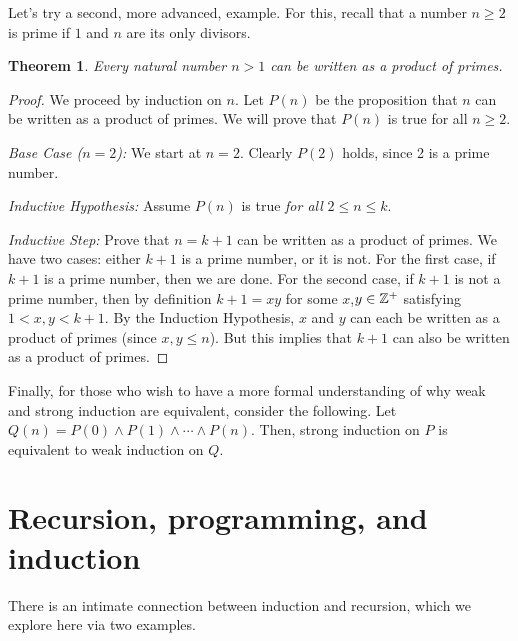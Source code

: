 \documentclass[11pt]{article}
\newcounter{thm}
\newtheorem{theorem}{Theorem}[thm]
\begin{document}
Let's try a second, more advanced, example. For this, recall that a number $n\geq 2$ is prime if $1$ and $n$ are its only divisors.

\begin{theorem}\label{thm:prodprimes}
    Every natural number $n > 1$ can be written as a product of primes.
\end{theorem}
\begin{proof}
We proceed by induction on $n$. Let $P(n)$ be the proposition
that $n$ can be written as a product of primes. We will prove that $P(n)$ is true for all $n \geq 2$.

\emph{Base Case ($n=2$):} We start at $n = 2$. Clearly $P(2)$ holds, since 2 is a prime number.

\emph{Inductive Hypothesis:} Assume $P(n)$ is true \emph{for all} $2 \leq n \leq k$.

\emph{Inductive Step:} Prove that $n=k+1$ can be written as a product of primes.
We have two cases: either $k+1$ is a prime number, or it is not.  For the first case, if $k+1$ is a prime
number, then we are done. For the second case, if $k+1$ is not a prime number, then by definition $k+1 = xy$ for some $x$,$y \in \mathbb{Z}^+$ satisfying $1 < x,y < k+1$. By the Induction Hypothesis, $x$ and $y$ can each be written as a product of primes
(since $x,y \leq n$). But this implies that $k+1$ can also be written as a product of primes.
\end{proof}


Finally, for those who wish to have a more formal understanding of why weak and strong induction are equivalent, consider the following. Let $Q(n)=P(0)\wedge P(1)\wedge\cdots\wedge P(n)$. Then, strong induction on $P$ is equivalent to weak induction on $Q$.



\section{Recursion, programming, and induction}

There is an intimate connection between induction and recursion, which we explore here via two examples.
\end{document}
